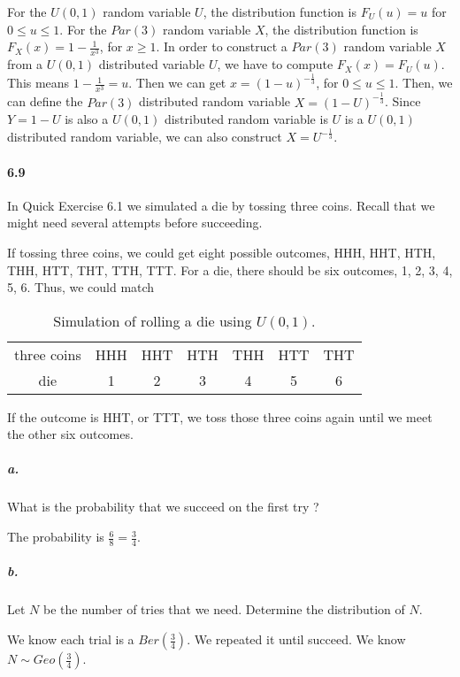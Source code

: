 \documentclass{article} %
\begin{document}
For the $U(0, 1)$ random variable $U$, the distribution function is $F_U(u) = u$ for $0 \leq u \leq 1$. For the $Par(3)$ random variable $X$, the distribution function is $F_X(x) = 1 - \frac{1}{x^{3}}$, for $x \geq 1$. In order to construct a $Par(3)$ random variable $X$ from a $U(0, 1)$ distributed variable $U$, we have to compute $F_X(x) = F_U(u)$. This means $1 - \frac{1}{x^3} = u$. Then we can get $x = (1-u)^{-\frac{1}{3}}$, for $0 \leq u \leq 1$. Then, we can define the $Par(3)$ distributed random variable $X = (1 - U)^{-\frac{1}{3}}$. Since $Y = 1-U$ is also a $U(0, 1)$ distributed random variable is $U$ is a $U(0, 1)$ distributed random variable, we can also construct $X = U^{-\frac{1}{3}}$.  

\paragraph*{6.9} In Quick Exercise 6.1 we simulated a die by tossing three coins. Recall that we might need several attempts before succeeding. 

If tossing three coins, we could get eight possible outcomes, {HHH, HHT, HTH, THH, HTT, THT, TTH, TTT}. For a die, there should be six outcomes, {1, 2, 3, 4, 5, 6}. Thus, we could match

\begin{table}[h!]
\renewcommand{\arraystretch}{1.5}
\centering
\caption{Simulation of rolling a die using $U(0, 1)$.}
\label{Ta:6.1a}
\begin{tabular}{|c|c|c|c|c|c|c|} \hline
three coins & HHH & HHT & HTH & THH & HTT & THT \\ 
die & 1 & 2 & 3 & 4 & 5 & 6 \\ \hline
\end{tabular}
\end{table}
If the outcome is HHT, or TTT, we toss those three coins again until we meet the other six outcomes. 

\subparagraph*{a.} What is the probability that we succeed on the first try ?

The probability is $\frac{6}{8} = \frac{3}{4}$. 

\subparagraph*{b.} Let $N$ be the number of tries that we need. Determine the distribution of $N$. 

We know each trial is a $Ber(\frac{3}{4})$. We repeated it until succeed. We know $N \sim Geo(\frac{3}{4})$. 
\end{document}
